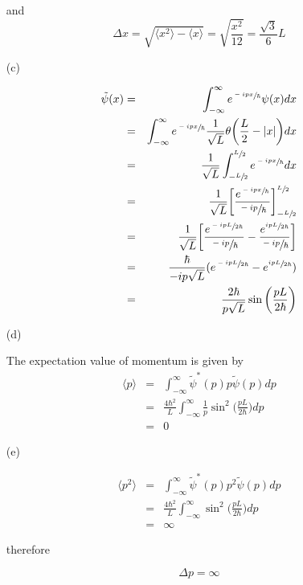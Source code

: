 \documentclass[11pt,a4paper]{article}
\newcommand{\bra}{\langle}
\newcommand{\ket}{\rangle}
\begin{document}
\begin{enumerate}
    and
    \begin{equation}
        \Delta x=\sqrt{\bra x^2 \ket-\bra x \ket}=\sqrt{\frac{x^2}{12}}=\frac{\sqrt{3}}{6}L
    \end{equation}

    \item[(c)]
    
    \begin{eqnarray}
        \tilde{\psi}(x)
        &=&\int_{-\infty}^{\infty}e^{\sfrac{-ipx}{\hbar}}\psi(x)dx\\
        &=&\int_{-\infty}^{\infty}e^{\sfrac{-ipx}{\hbar}}\frac{1}{\sqrt{L}}\theta\bigg(\frac{L}{2}-|x|\bigg)dx\\
        &=&\frac{1}{\sqrt{L}}\int_{-\sfrac{L}{2}}^{\sfrac{L}{2}}e^{\sfrac{-ipx}{\hbar}}dx\\
        &=&\frac{1}{\sqrt{L}}\bigg[\frac{e^{\sfrac{-ipx}{\hbar}}}{\sfrac{-ip}{\hbar}}\bigg]_{-\sfrac{L}{2}}^{\sfrac{L}{2}}\\
        &=&\frac{1}{\sqrt{L}}\bigg[\frac{e^{\sfrac{-ipL}{2\hbar}}}{\sfrac{-ip}{\hbar}}-\frac{e^{\sfrac{ipL}{2\hbar}}}{\sfrac{-ip}{\hbar}}\bigg]\\
        &=&\frac{\hbar}{-ip\sqrt{L}}(e^{\sfrac{-ipL}{2\hbar}}-e^{\sfrac{ipL}{2\hbar}})\\
        &=&\frac{2\hbar}{p\sqrt{L}}\sin\bigg(\frac{pL}{2\hbar}\bigg)
    \end{eqnarray}

    \item[(d)]
    
    The expectation value of momentum is given by
    \begin{eqnarray}
        \bra p \ket
        &=&\int_{-\infty}^{\infty}\tilde{\psi}^*(p)p\tilde{\psi}(p)dp\\
        &=&\frac{4\hbar^2}{L}\int_{-\infty}^{\infty}\frac{1}{p}\sin^2\bigg(\frac{pL}{2\hbar}\bigg)dp\\
        &=&0
    \end{eqnarray}

    \item[(e)]

    \begin{eqnarray}
        \bra p^2 \ket
        &=&\int_{-\infty}^{\infty}\tilde{\psi}^*(p)p^2\tilde{\psi}(p)dp\\
        &=&\frac{4\hbar^2}{L}\int_{-\infty}^{\infty}\sin^2\bigg(\frac{pL}{2\hbar}\bigg)dp\\
        &=&\infty
    \end{eqnarray}

    therefore

    \begin{equation}
        \Delta p=\infty
    \end{equation}

\end{enumerate}
\end{document}
